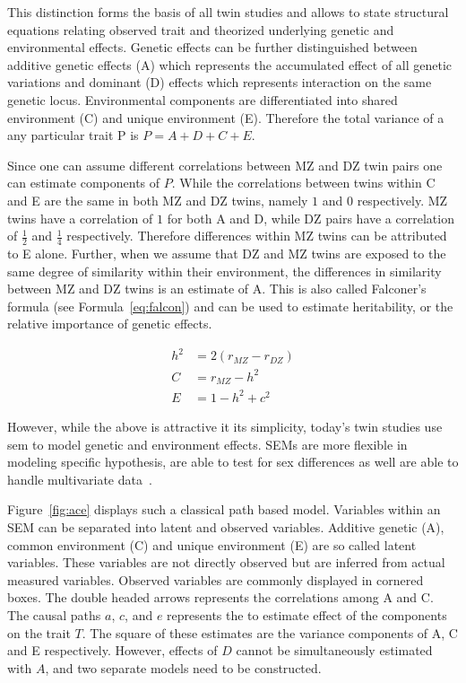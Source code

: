 This distinction forms the basis of all twin studies and allows to state structural equations relating observed trait and theorized underlying genetic and environmental effects.
Genetic effects can be further distinguished between additive genetic effects (A) which represents the accumulated effect of all genetic variations and dominant (D) effects which represents interaction on the same genetic locus.
Environmental components are differentiated into shared environment (C) and unique environment (E).
Therefore the total variance of a any particular trait P is $P = A+D+C+E$.

Since one can assume different correlations between MZ and DZ twin pairs one can estimate components of $P$.
While the correlations between twins within C and E are the same in both MZ and DZ twins, namely $1$ and $0$ respectively.
MZ twins have a correlation of $1$ for both A and D, while DZ pairs have a correlation of $\frac{1}{2}$ and $\frac{1}{4}$ respectively.
Therefore differences within MZ twins can be attributed to E alone.
Further, when we assume that DZ and MZ twins are exposed to the same degree of similarity within their environment, the differences in similarity between MZ and DZ twins is an estimate of A.
This is also called Falconer's formula (see Formula~\ref{eq:falcon}) and can be used to estimate heritability, or the relative importance of genetic effects.

\begin{align}
  h^2 &= 2(r_{MZ}-r_{DZ})\label{eq:falcon} \\ 
  C &= r_{MZ} - h^2  \\
  E &= 1 - h^2 + c^2  
\end{align}

However, while the above is attractive it its simplicity, today's twin studies use \acrfull{sem} to model genetic and environment effects.
SEMs are more flexible in modeling specific hypothesis, are able to test for sex differences as well are able to handle multivariate data~\cite{Rijsdijk2002}.

Figure~\ref{fig:ace} displays such a classical path based model.
Variables within an SEM can be separated into latent and observed variables.
Additive genetic (A), common environment (C) and unique environment (E) are so called latent variables.
These variables are not directly observed but are inferred from actual measured variables.
Observed variables are commonly displayed in cornered boxes.
The double headed arrows represents the correlations among A and C.
The causal paths $a$, $c$, and $e$ represents the to estimate effect of the components on the trait $T$.
The square of these estimates are the variance components of A, C and E respectively.
However, effects of $D$ cannot be simultaneously estimated with $A$, and two separate models need to be constructed.

